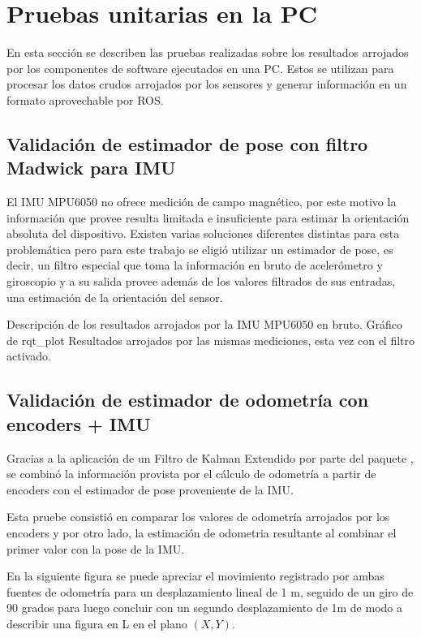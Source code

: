 \section{Pruebas unitarias en la PC}

En esta sección se describen las pruebas realizadas sobre los resultados arrojados por los componentes de software ejecutados en una PC. Estos se utilizan para procesar los datos crudos arrojados por los sensores y generar información en un formato aprovechable por ROS.

\subsection{Validación de estimador de pose con filtro Madwick para IMU}

El IMU MPU6050 no ofrece medición de campo magnético, por este motivo la información que provee resulta limitada e insuficiente para estimar la orientación absoluta del dispositivo.
Existen varias soluciones diferentes distintas para esta problemática pero para este trabajo se eligió utilizar un estimador de pose, es decir, un filtro especial que toma la información en bruto de acelerómetro y giroscopio y a su salida provee además de los valores filtrados de sus entradas, una estimación de la orientación del sensor.

Descripción de los resultados arrojados por la IMU MPU6050 en bruto. Gráfico de rqt\_plot
Resultados arrojados por las mismas mediciones, esta vez con el filtro activado.

\subsection{Validación de estimador de odometría con encoders + IMU}

Gracias a la aplicación de un Filtro de Kalman Extendido por parte del paquete , se combinó la información provista por el cálculo de odometría a partir de encoders con el estimador de pose proveniente de la IMU.

Esta pruebe consistió en comparar los valores de odometría arrojados por los encoders y por otro lado, la estimación de odometria resultante al combinar el primer valor con la pose de la IMU.

En la siguiente figura se puede apreciar el movimiento registrado por ambas fuentes de odometría para un desplazamiento lineal de 1 m, seguido de un giro de 90 grados para luego concluir con un segundo desplazamiento de 1m de modo a describir una figura en L en el plano $(X,Y)$.

